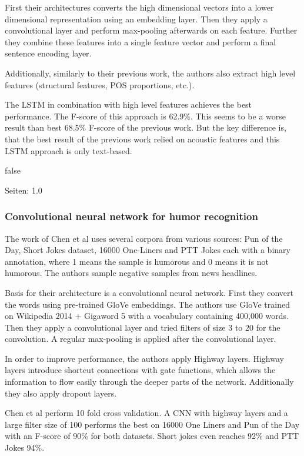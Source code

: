 \documentclass[draft,final,oneside]{vutinfth} %
\begin{document}
First their architectures converts the high dimensional vectors into a lower dimensional representation using an embedding layer. Then they apply a convolutional layer and perform max-pooling afterwards on each feature. Further they combine these features into a single feature vector and perform a final sentence encoding layer. 

Additionally, similarly to their previous work, the authors also extract high level features (structural features, POS proportions, etc.).

The LSTM in combination with high level features achieves the best performance. The F-score of this approach is 62.9\%. This seems to be a worse result than best 68.5\% F-score of the previous work. But the key difference is, that the best result of the previous work relied on acoustic features and this LSTM approach is only text-based.

\if false
\cite{bertero2016long}

Seiten: 1.0
\fi

\subsubsection{Convolutional neural network for humor recognition \cite{chen2017convolutional}}

The work of Chen et al uses several corpora from various sources: Pun of the Day, Short Jokes dataset, 16000 One-Liners and PTT Jokes each with a binary annotation, where 1 means the sample is humorous and 0 means it is not humorous. The authors sample negative samples from news headlines.

Basis for their architecture is a convolutional neural network. First they convert the words using pre-trained GloVe embeddings. The authors use GloVe trained on Wikipedia 2014 + Gigaword 5 with a vocabulary containing 400,000 words. Then they apply a convolutional layer and tried filters of size 3 to 20 for the convolution. A regular max-pooling is applied after the convolutional layer.

In order to improve performance, the authors apply Highway layers. Highway layers introduce shortcut connections with gate functions, which allows the information to flow easily through the deeper parts of the network. Additionally they also apply dropout layers.

Chen et al perform 10 fold cross validation. A CNN with highway layers and a large filter size of 100 performs the best on 16000 One Liners and Pun of the Day with an F-score of 90\% for both datasets. Short jokes even reaches 92\% and PTT Jokes 94\%. 
\end{document}
